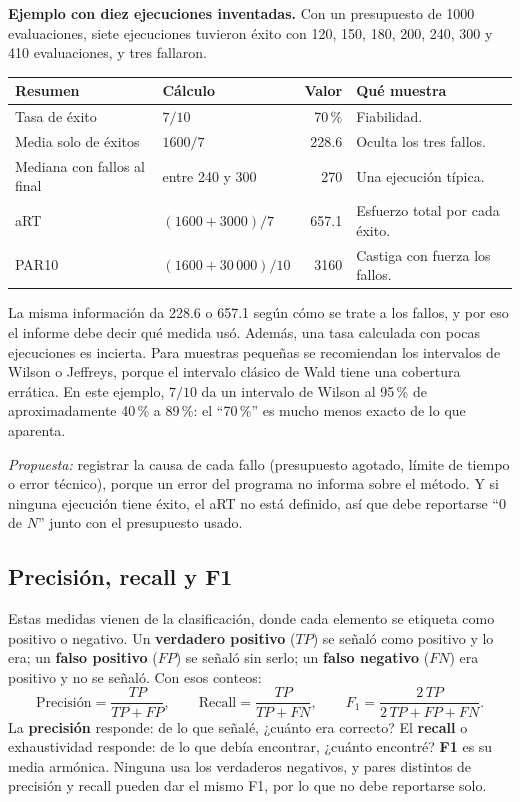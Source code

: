 \documentclass[letterpaper,12pt]{report}
\begin{document}
\textbf{Ejemplo con diez ejecuciones inventadas.} Con un presupuesto de 1000 evaluaciones, siete ejecuciones tuvieron éxito con 120, 150, 180, 200, 240, 300 y 410 evaluaciones, y tres fallaron.

\begin{center}
\small
\begin{tabular}{@{}P{4.8cm}P{3.5cm}rP{5.3cm}@{}}
\toprule
\textbf{Resumen} & \textbf{Cálculo} & \textbf{Valor} & \textbf{Qué muestra}\\
\midrule
Tasa de éxito & $7/10$ & 70\,\% & Fiabilidad.\\
Media solo de éxitos & $1600/7$ & 228.6 & Oculta los tres fallos.\\
Mediana con fallos al final & entre 240 y 300 & 270 & Una ejecución típica.\\
aRT & $(1600+3000)/7$ & 657.1 & Esfuerzo total por cada éxito.\\
PAR10 & $(1600+30\,000)/10$ & 3160 & Castiga con fuerza los fallos.\\
\bottomrule
\end{tabular}
\end{center}

La misma información da 228.6 o 657.1 según cómo se trate a los fallos, y por eso el informe debe decir qué medida usó. Además, una tasa calculada con pocas ejecuciones es incierta. Para muestras pequeñas se recomiendan los intervalos de Wilson o Jeffreys, porque el intervalo clásico de Wald tiene una cobertura errática. En este ejemplo, $7/10$ da un intervalo de Wilson al 95\,\% de aproximadamente 40\,\% a 89\,\%: el ``70\,\%'' es mucho menos exacto de lo que aparenta.

\emph{Propuesta:} registrar la causa de cada fallo (presupuesto agotado, límite de tiempo o error técnico), porque un error del programa no informa sobre el método. Y si ninguna ejecución tiene éxito, el aRT no está definido, así que debe reportarse ``0 de $N$'' junto con el presupuesto usado.

\subsection{Precisión, recall y F1}
Estas medidas vienen de la clasificación, donde cada elemento se etiqueta como positivo o negativo. Un \textbf{verdadero positivo} ($TP$) se señaló como positivo y lo era; un \textbf{falso positivo} ($FP$) se señaló sin serlo; un \textbf{falso negativo} ($FN$) era positivo y no se señaló. Con esos conteos:
\begin{equation}
\text{Precisión}=\frac{TP}{TP+FP},\qquad
\text{Recall}=\frac{TP}{TP+FN},\qquad
F_1=\frac{2\,TP}{2\,TP+FP+FN}.\label{eq:prf}
\end{equation}
La \textbf{precisión} responde: de lo que señalé, ¿cuánto era correcto? El \textbf{recall} o exhaustividad responde: de lo que debía encontrar, ¿cuánto encontré? \textbf{F1} es su media armónica. Ninguna usa los verdaderos negativos, y pares distintos de precisión y recall pueden dar el mismo F1, por lo que no debe reportarse solo.
\end{document}
